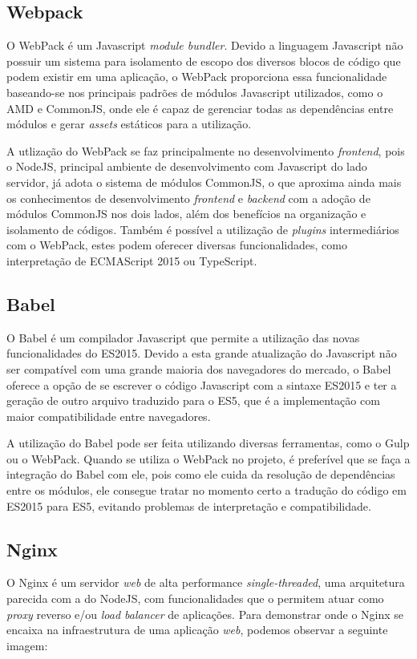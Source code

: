 \subsection{Webpack}
O WebPack \cite{webpack} é um Javascript \textit{module bundler}. Devido a linguagem Javascript não possuir um sistema para isolamento de escopo dos diversos blocos de código que podem existir em uma aplicação, o WebPack proporciona essa funcionalidade baseando-se nos principais padrões de módulos Javascript utilizados, como o AMD e CommonJS, onde ele é capaz de gerenciar todas as dependências entre módulos e gerar \textit{assets} estáticos para a utilização.

A utlização do WebPack se faz principalmente no desenvolvimento \textit{frontend}, pois o NodeJS, principal ambiente de desenvolvimento com Javascript do lado servidor, já adota o sistema de módulos CommonJS, o que aproxima ainda mais os conhecimentos de desenvolvimento \textit{frontend} e \textit{backend} com a adoção de módulos CommonJS nos dois lados, além dos benefícios na organização e isolamento de códigos. Também é possível a utilização de \textit{plugins} intermediários com o WebPack, estes podem oferecer diversas funcionalidades, como interpretação de ECMAScript 2015 ou TypeScript.

\subsection{Babel}
O Babel \cite{babel} é um compilador Javascript que permite a utilização das novas funcionalidades do ES2015. Devido a esta grande atualização do Javascript não ser compatível com uma grande maioria dos navegadores do mercado, o Babel oferece a opção de se escrever o código Javascript com a sintaxe ES2015 e ter a geração de outro arquivo traduzido para o ES5, que é a implementação com maior compatibilidade entre navegadores.

A utilização do Babel pode ser feita utilizando diversas ferramentas, como o Gulp ou o WebPack. Quando se utiliza o WebPack no projeto, é preferível que se faça a integração do Babel com ele, pois como ele cuida da resolução de dependências entre os módulos, ele consegue tratar no momento certo a tradução do código em ES2015 para ES5, evitando problemas de interpretação e compatibilidade. 

\subsection{Nginx}
O Nginx \cite{nginx} é um servidor \textit{web} de alta performance \textit{single-threaded}, uma arquitetura parecida com a do NodeJS, com funcionalidades que o permitem atuar como \textit{proxy} reverso e/ou \textit{load balancer} de aplicações. Para demonstrar onde o Nginx se encaixa na infraestrutura de uma aplicação \textit{web}, podemos observar a seguinte imagem:

